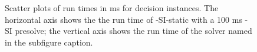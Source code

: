 \begin{figure}[htb]
{        \label{figure:TODO}
    }
    \caption{Scatter plots of run times in ms for decision instances.
            The horizontal axis shows the the run time of \McSplit-SI-static
            with a 100 ms \McSplit-SI presolve; the vertical axis shows
            the run time of the solver named in the subfigure caption.}
    \label{figure:TODO}
\end{figure}

